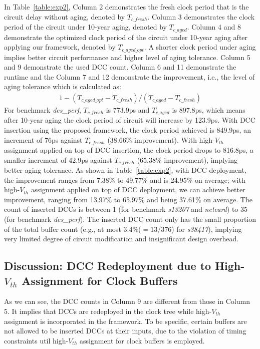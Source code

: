 In Table~\ref{table:exp2}, Column 2  demonstrates the fresh clock period that is the circuit delay without aging, denoted by $T_{c\_fresh}$. Column 3 demonstrates the clock period of the circuit under 10-year aging, denoted by $T_{c\_aged}$. Column 4 and 8 demonstrate the optimized clock period of the circuit under 10-year aging after applying our framework, denoted by $T_{c\_aged\_opt}$. A shorter clock period under aging implies better circuit performance and higher level of aging tolerance. Column 5 and 9 demonstrate the used DCC count. Column 6 and 11 demonstrate the runtime and the Column 7 and 12 demonstrate the improvement, i.e., the level of aging tolerance which is calculated as:
\begin{gather*}
1 - (T_{c\_aged\_opt} - T_{c\_fresh}) / (T_{c\_aged} - T_{c\_fresh})
\end{gather*}
For benchmark \textit{des\_perf}, $T_{c\_fresh}$ is 773.9ps and $T_{c\_aged}$ is 897.8ps, which means after 10-year aging the clock period of circuit will increase by 123.9ps. With DCC insertion using the proposed framework, the clock period achieved is 849.9ps, an increment of 76ps against $T_{c\_fresh}$ (38.66\% improvement). With high-$V_{th}$ assignment applied on top of DCC insertion, the clock period drops to 816.8ps, a smaller increment of 42.9ps against $T_{c\_fresh}$ (65.38\% improvement), implying better aging tolerance. As shown in Table~\ref{table:exp2}, with DCC deployment, the improvement ranges from 7.38\% to 49.77\% and is 24.95\% on average; with high-$V_{th}$ assignment applied on top of DCC deployment, we can achieve better improvement, ranging from 13.97\% to 65.97\% and being 37.61\% on average. The count of inserted DCCs is between 1 (for benchmark \textit{s13207} and \textit{netcard}) to 35 (for benchmark \textit{des\_perf}). The inserted DCC count only has the small proportion of the total buffer count (e.g., at most 3.4\%($= 13/376$) for \textit{s38417}), implying very limited degree of circuit modification and insignificant design overhead. 

\subsection{Discussion: DCC Redeployment due to High-$V_{th}$ Assignment for Clock Buffers}
As we can see, the DCC counts in Column 9 are different from those in Column 5. It implies that DCCs are redeployed in the clock tree while high-$V_{th}$ assignment is incorporated in the framework. To be specific, certain buffers are not allowed to be inserted DCCs at their inputs, due to the violation of timing constraints util high-$V_{th}$ assignment for clock buffers is employed.

